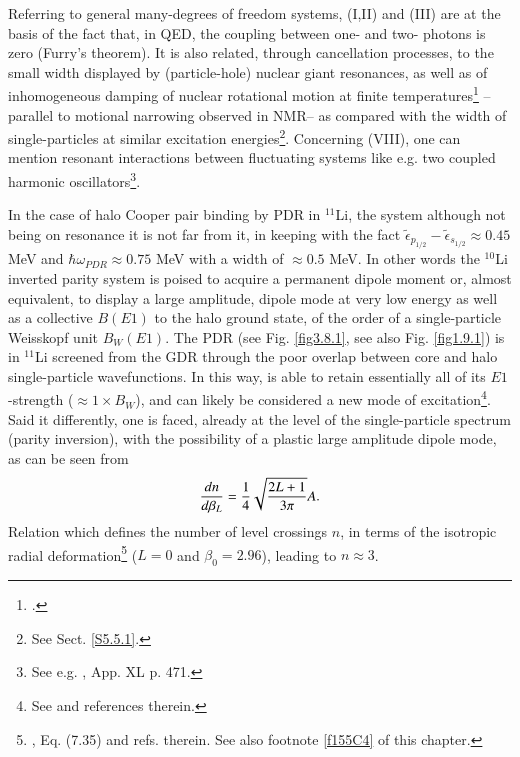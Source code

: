  Referring to general many-degrees of freedom systems, (I,II) and (III) are at the basis of the fact that, in QED, the coupling between one- and two- photons is zero (Furry's theorem). It is also related, through cancellation processes, to the small width displayed by (particle-hole) nuclear giant resonances, as well as of inhomogeneous damping of nuclear  rotational motion at finite temperatures\footnote{\cite{Broglia:87}.} --parallel to motional narrowing observed in NMR--  as compared with the  width of single-particles at  similar excitation energies\footnote{See Sect. \ref{S5.5.1}.}. Concerning (VIII), one can mention resonant interactions between fluctuating systems like e.g. two coupled harmonic oscillators\footnote{See e.g. \cite{Born:69}, App. XL p. 471.}. 




In the case of halo Cooper pair binding by PDR in $^{11}$Li, the system although not being on resonance it is not far from it, in keeping with the fact $\widetilde\epsilon_{p_{1/2}}-\widetilde\epsilon_{s_{1/2}}\approx 0.45$ MeV and $\hbar\omega_{PDR}\approx0.75$ MeV with a width of $\approx0.5$ MeV. In other words the $^{10}$Li inverted parity system is poised to acquire a permanent dipole moment or, almost equivalent, to display a large amplitude, dipole mode at very low energy as well as a collective $B(E1)$ to the halo ground state, of the order of a single-particle Weisskopf unit $B_{W}(E1)$. The PDR (see Fig. \ref{fig3.8.1}, see also Fig. \ref{fig1.9.1}) is in $^{11}$Li  screened from the GDR through the poor overlap between core and halo single-particle wavefunctions. In this way, is able to retain essentially all of its  $E1$-strength ($\approx1\times B_{W}$), and can likely be considered a new mode of excitation\footnote{See \cite{Broglia:19} and references therein.}. Said it differently, one is faced, already at the level of the single-particle spectrum (parity inversion), with the possibility of a plastic large amplitude dipole mode, as can be seen from  
\begin{align}\label{eq3C6}
\frac{dn}{d\beta_L}=\frac{1}{4}\sqrt{\frac{2L+1}{3\pi}}A. \idx{Dynamical binding}
\end{align}  
Relation which defines the number of level crossings $n$, in terms of the isotropic radial deformation\footnote{\cite{Brink:05}, Eq. (7.35) and refs. therein. See also footnote \ref{f155C4} of this chapter.} 
($L=0$ and $\beta_0=2.96$),  leading to $n\approx 3$.
